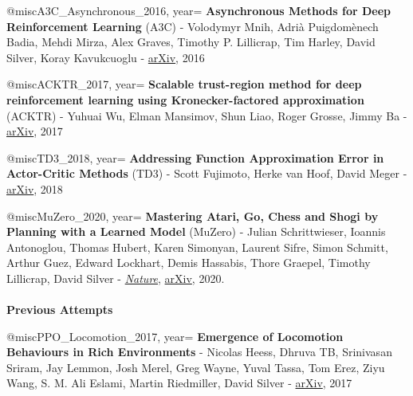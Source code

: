 @misc{A3C_Asynchronous_2016, 
    year={
    \textbf{Asynchronous Methods for Deep Reinforcement Learning} (A3C)
    - Volodymyr Mnih, Adrià Puigdomènech Badia, Mehdi Mirza, Alex Graves, Timothy P. Lillicrap, Tim Harley, David Silver, Koray Kavukcuoglu -
     \href{https://arxiv.org/abs/1602.01783}{arXiv},
    2016}
}

 
@misc{ACKTR_2017, 
    year={
    \textbf{Scalable trust-region method for deep reinforcement learning using Kronecker-factored approximation} (ACKTR)
    - Yuhuai Wu, Elman Mansimov, Shun Liao, Roger Grosse, Jimmy Ba -
     \href{https://arxiv.org/abs/1708.05144}{arXiv},
    2017}
}

 

@misc{TD3_2018, 
    year={
    \textbf{Addressing Function Approximation Error in Actor-Critic Methods} (TD3)
    - Scott Fujimoto, Herke van Hoof, David Meger -
     \href{https://arxiv.org/abs/1802.09477}{arXiv},
    2018}
}


@misc{MuZero_2020, 
    year={
    \textbf{Mastering Atari, Go, Chess and Shogi by Planning with a Learned Model} (MuZero)
    - Julian Schrittwieser, Ioannis Antonoglou, Thomas Hubert, Karen Simonyan, Laurent Sifre, Simon Schmitt, Arthur Guez, Edward Lockhart, Demis Hassabis, Thore Graepel, Timothy Lillicrap, David Silver -
    \href{https://www.nature.com/articles/s41586-020-03051-4}{\textit{Nature}}, \href{https://arxiv.org/abs/1911.08265}{arXiv},
    2020.\\\\ \textbf{Previous Attempts} }
}

@misc{PPO_Locomotion_2017, 
    year={
    \textbf{Emergence of Locomotion Behaviours in Rich Environments}
    - Nicolas Heess, Dhruva TB, Srinivasan Sriram, Jay Lemmon, Josh Merel, Greg Wayne, Yuval Tassa, Tom Erez, Ziyu Wang, S. M. Ali Eslami, Martin Riedmiller, David Silver -
     \href{https://arxiv.org/abs/1707.02286}{arXiv},
    2017}
}















 